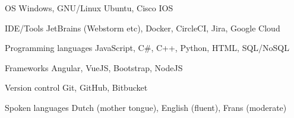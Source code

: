 
\begin{cvskills}

    \cvskill
        {OS} %
        {Windows, GNU/Linux Ubuntu, Cisco IOS} %
    
    \cvskill
        {IDE/Tools} %
        {JetBrains (Webstorm etc), Docker, CircleCI, Jira, Google Cloud} %
    
    \cvskill
        {Programming languages} %
        {JavaScript, C\#, C++, Python, HTML, SQL/NoSQL} %

    \cvskill
        {Frameworks} %
        {Angular, VueJS, Bootstrap, NodeJS} %
    
    \cvskill
        {Version control} %
        {Git, GitHub, Bitbucket} %
    
    \cvskill
        {Spoken languages} %
        {Dutch (mother tongue), English (fluent), Frans (moderate)} %
    
\end{cvskills}
